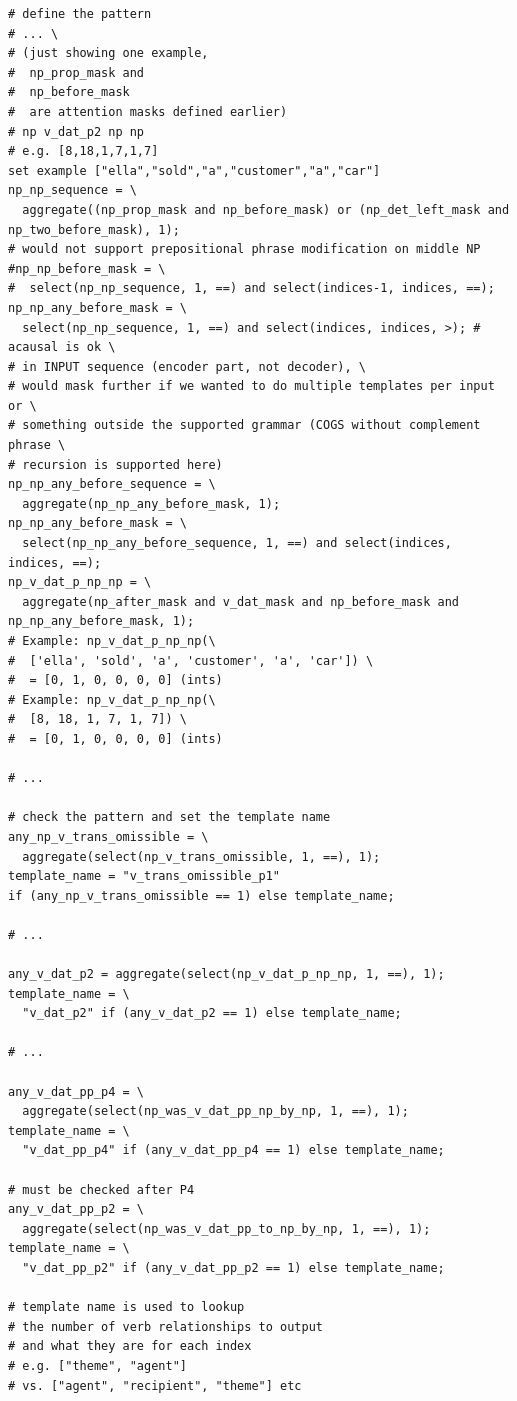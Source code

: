 \documentclass[11pt]{article}
\begin{document}
\begin{tiny}
\begin{verbatim}
# define the pattern
# ... \
# (just showing one example, 
#  np_prop_mask and 
#  np_before_mask 
#  are attention masks defined earlier)
# np v_dat_p2 np np
# e.g. [8,18,1,7,1,7]
set example ["ella","sold","a","customer","a","car"]
np_np_sequence = \
  aggregate((np_prop_mask and np_before_mask) or (np_det_left_mask and np_two_before_mask), 1);
# would not support prepositional phrase modification on middle NP
#np_np_before_mask = \
#  select(np_np_sequence, 1, ==) and select(indices-1, indices, ==);
np_np_any_before_mask = \
  select(np_np_sequence, 1, ==) and select(indices, indices, >); # acausal is ok \
# in INPUT sequence (encoder part, not decoder), \
# would mask further if we wanted to do multiple templates per input or \
# something outside the supported grammar (COGS without complement phrase \
# recursion is supported here)
np_np_any_before_sequence = \
  aggregate(np_np_any_before_mask, 1);
np_np_any_before_mask = \
  select(np_np_any_before_sequence, 1, ==) and select(indices, indices, ==);
np_v_dat_p_np_np = \
  aggregate(np_after_mask and v_dat_mask and np_before_mask and np_np_any_before_mask, 1);
# Example: np_v_dat_p_np_np(\
#  ['ella', 'sold', 'a', 'customer', 'a', 'car']) \
#  = [0, 1, 0, 0, 0, 0] (ints)
# Example: np_v_dat_p_np_np(\
#  [8, 18, 1, 7, 1, 7]) \
#  = [0, 1, 0, 0, 0, 0] (ints)

# ...

# check the pattern and set the template name
any_np_v_trans_omissible = \
  aggregate(select(np_v_trans_omissible, 1, ==), 1);
template_name = "v_trans_omissible_p1" 
if (any_np_v_trans_omissible == 1) else template_name;

# ...

any_v_dat_p2 = aggregate(select(np_v_dat_p_np_np, 1, ==), 1);
template_name = \
  "v_dat_p2" if (any_v_dat_p2 == 1) else template_name;

# ...

any_v_dat_pp_p4 = \
  aggregate(select(np_was_v_dat_pp_np_by_np, 1, ==), 1);
template_name = \
  "v_dat_pp_p4" if (any_v_dat_pp_p4 == 1) else template_name;

# must be checked after P4
any_v_dat_pp_p2 = \
  aggregate(select(np_was_v_dat_pp_to_np_by_np, 1, ==), 1);
template_name = \
  "v_dat_pp_p2" if (any_v_dat_pp_p2 == 1) else template_name;

# template name is used to lookup 
# the number of verb relationships to output
# and what they are for each index
# e.g. ["theme", "agent"] 
# vs. ["agent", "recipient", "theme"] etc
\end{verbatim}
\end{tiny}
\clearpage
\end{document}
